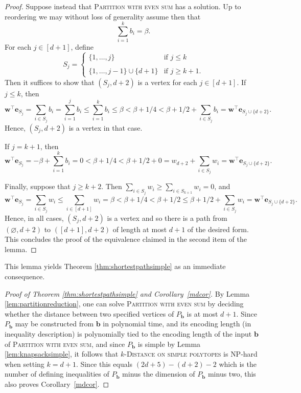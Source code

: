 \documentclass[centering,11pt,reqno]{amsart}
\theoremstyle{definition}
\renewcommand{\emptyset}{\varnothing}
\newcommand{\NP}{\textsc{NP}}
\begin{document}
\begin{proof}
Suppose instead that \textsc{Partition with even sum} has a solution. Up to reordering we may without loss of generality assume then that
\[\sum_{i=1}^{k} b_{i} = \beta.\]
For each $j\in [d+1]$, define 
\[S_{j} =\begin{cases}
    \{1, \dots,j\} &\text{if } j \leq k \\ \\
    \{1,\dots, j-1\} \cup \{d+1\} &\text{if } j\ge k+1. 
\end{cases}\]
Then it suffices to show that $(S_{j}, d+2)$ is a vertex for each $j \in [d+1]$. If $j \leq k$, then 
\[\mathbf{w}^{\intercal} \mathbf{e}_{S_{j}} = \sum_{i \in S_{j}} b_{i} = \sum_{i=1}^{j} b_{i} \leq \sum_{i=1}^{k} b_{i} \leq \beta < \beta + 1/4 < \beta + 1/2 + \sum_{i\in S_{j}} b_{i} = \mathbf{w}^{\intercal} \mathbf{e}_{S_{j} \cup \{d+2\}}.\]
Hence, $(S_{j}, d+2)$ is a vertex in that case. 

If $j = k+1$, then
\[\mathbf{w}^{\intercal} \mathbf{e}_{S_{j}} = -\beta + \sum_{i=1}^{k} b_{i} = 0 < \beta + 1/4 < \beta + 1/2 + 0 = w_{d+2} + \sum_{i \in S_{j}} w_{i} = \mathbf{w}^{\intercal} \mathbf{e}_{S_{j} \cup \{d+2\}}.\]

Finally, suppose that $j \geq k+2$. Then $\sum_{i \in S_{j}} w_{i} \geq \sum_{i\in S_{k+1}}w_i=0$, and
\[\mathbf{w}^{\intercal}\mathbf{e}_{S_{j}} = \sum_{i \in S_{j}} w_{i} \leq \sum_{i \in [d+1]} w_{i} = \beta < \beta + 1/4 < \beta + 1/2 \leq \beta + 1/2 + \sum_{i \in S_{j}} w_{i} = \mathbf{w}^{\intercal} \mathbf{e}_{S_{j} \cup \{d+2\}}.\]
Hence, in all cases, $(S_{j}, d+2)$ is a vertex and so there is a path from $(\emptyset, d+2)$ to $([d+1], d+2)$ of length at most $d+1$ of the desired form. This concludes the proof of the equivalence claimed in the second item of the lemma. 
\end{proof}

This lemma yields Theorem \ref{thm:shortestpathsimple} as an immediate consequence.

\begin{proof}[Proof of Theorem \ref{thm:shortestpathsimple} and Corollary~\ref{mdcor}]
By Lemma \ref{lem:partitionreduction}, one can solve \textsc{Partition with even sum} by deciding whether the distance between two specified vertices of  $P_{\mathbf{b}}$ is at most $d+1$. Since $P_{\mathbf{b}}$ may be constructed from $\mathbf{b}$ in polynomial time, and its encoding length (in inequality description) is polynomially tied to the encoding length of the input $\mathbf{b}$ of \textsc{Partition with even sum}, and since $P_{\mathbf{b}}$ is simple by Lemma \ref{lem:knapsacksimple}, it follows that \textsc{$k$-Distance on simple polytopes} is \NP-hard when setting $k=d+1$. Since this equals $(2d+5)-(d+2)-2$ which is the number of defining inequalities of $P_\mathbf{b}$ minus the dimension of $P_\mathbf{b}$ minus two, this also proves Corollary~\ref{mdcor}.
\end{proof}
\end{document}
